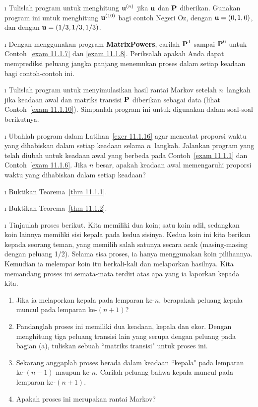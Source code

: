 \begin{LJSItem}
\i\label{exer 11.1.14} Tulislah program untuk menghitung ${\mbox{\bf u}\/}^{(n)}$ jika
${\mbox{\bf u}\/}$ dan ${\mbox{\bf P}\/}$ diberikan. Gunakan program ini untuk menghitung ${\mbox{\bf u}\/}^{(10)}$ bagi contoh Negeri Oz, dengan ${\mbox{\bf u}\/} = (0, 1, 0)$, dan dengan
${\mbox{\bf u}\/} = (1/3, 1/3, 1/3)$.

\i\label{exer 11.1.15} Dengan menggunakan program {\bf  MatrixPowers}, carilah
${\mbox{\bf P}\/}^1$ sampai ${\mbox{\bf P}\/}^6$ untuk Contoh~\ref{exam 11.1.7} dan
\ref{exam 11.1.8}. Periksalah apakah Anda dapat memprediksi peluang jangka
panjang menemukan proses dalam setiap keadaan bagi contoh-contoh ini.

\i\label{exer 11.1.16} Tulislah program untuk menyimulasikan hasil rantai Markov
setelah $n$~langkah jika keadaan awal dan matriks transisi ${\mbox{\bf P}\/}$ diberikan
sebagai data (lihat Contoh~\ref{exam 11.1.10}). Simpanlah program ini untuk
digunakan dalam soal-soal berikutnya.

\i\label{exer 11.1.17} Ubahlah program dalam Latihan~\ref{exer 11.1.16} agar
mencatat proporsi waktu yang dihabiskan dalam setiap keadaan selama $n$~langkah.
Jalankan program yang telah diubah untuk keadaan awal yang berbeda pada
Contoh~\ref{exam 11.1.1} dan Contoh~\ref{exam 11.1.6}. Jika $n$ besar, apakah
keadaan awal memengaruhi proporsi waktu yang dihabiskan dalam setiap keadaan?

\i\label{exer 11.1.18} Buktikan Teorema~\ref{thm 11.1.1}.

\i\label{exer 11.1.19} Buktikan Teorema~\ref{thm 11.1.2}.

\i\label{exer 11.1.20} Tinjaulah proses berikut. Kita memiliki dua koin; satu
koin adil, sedangkan koin lainnya memiliki sisi kepala pada kedua sisinya.
Kedua koin ini kita berikan kepada seorang teman, yang memilih salah satunya
secara acak (masing-masing dengan peluang 1/2). Selama sisa proses, ia hanya
menggunakan koin pilihannya. Kemudian ia melempar koin itu berkali-kali dan
melaporkan hasilnya. Kita memandang proses ini semata-mata terdiri atas apa
yang ia laporkan kepada kita.
\begin{enumerate}
\item Jika ia melaporkan kepala pada lemparan ke-$n$, berapakah peluang kepala
muncul pada lemparan ke-$(n+1)$?

\item Pandanglah proses ini memiliki dua keadaan, kepala dan ekor. Dengan
menghitung tiga peluang transisi lain yang serupa dengan peluang pada bagian
(a), tuliskan sebuah ``matriks transisi" untuk proses ini.

\item Sekarang anggaplah proses berada dalam keadaan ``kepala" pada lemparan
ke-$(n-1)$ maupun ke-$n$. Carilah peluang bahwa kepala muncul pada lemparan
ke-$(n+1)$.

\item Apakah proses ini merupakan rantai Markov?
\end{enumerate}

\end{LJSItem}

